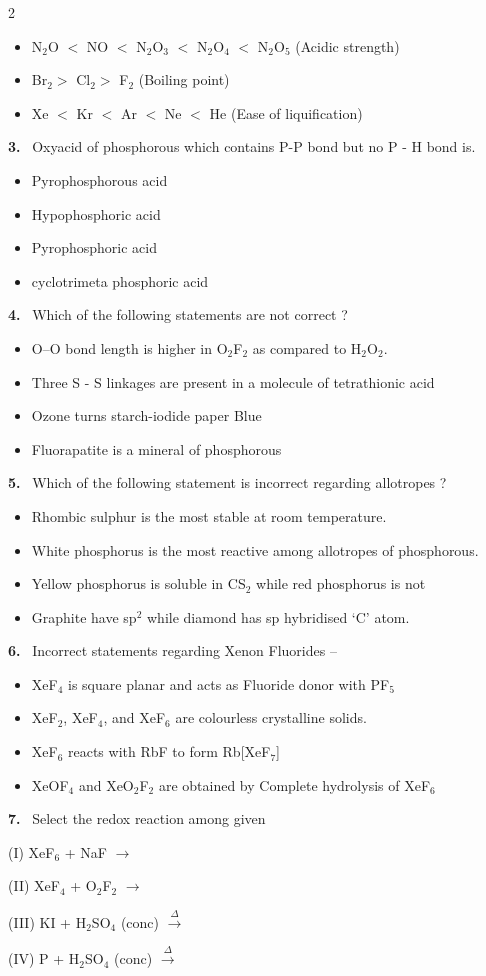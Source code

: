 \documentclass[10pt]{extarticle}
\newcommand{\qn}[1]{\par\smallskip\noindent\textbf{#1.}~}
\newenvironment{qoptions}{\begin{itemize}[leftmargin=1.8em,itemsep=1pt,topsep=2pt,label={}]}{\end{itemize}}
\newcommand{\opt}[2]{\item[(#1)] #2}
\begin{document}
\begin{multicols}{2}
\begin{qoptions}
\opt{B}{N$_2$O $<$ NO $<$ N$_2$O$_3$ $<$ N$_2$O$_4$ $<$ N$_2$O$_5$ (Acidic strength)}
\opt{C}{Br$_2>$ Cl$_2>$ F$_2$ (Boiling point)}
\opt{D}{Xe $<$ Kr $<$ Ar $<$ Ne $<$ He (Ease of liquification)}
\end{qoptions}
\qn{3} Oxyacid of phosphorous which contains P-P bond but no P - H bond is.
\begin{qoptions}
\opt{A}{Pyrophosphorous acid}
\opt{B}{Hypophosphoric acid}
\opt{C}{Pyrophosphoric acid}
\opt{D}{cyclotrimeta phosphoric acid}
\end{qoptions}
\qn{4} Which of the following statements are not correct ?
\begin{qoptions}
\opt{A}{O--O bond length is higher in O$_2$F$_2$ as compared to H$_2$O$_2$.}
\opt{B}{Three S - S linkages are present in a molecule of tetrathionic acid}
\opt{C}{Ozone turns starch-iodide paper Blue}
\opt{D}{Fluorapatite is a mineral of phosphorous}
\end{qoptions}
\qn{5} Which of the following statement is incorrect regarding allotropes ?
\begin{qoptions}
\opt{A}{Rhombic sulphur is the most stable at room temperature.}
\opt{B}{White phosphorus is the most reactive among allotropes of phosphorous.}
\opt{C}{Yellow phosphorus is soluble in CS$_2$ while red phosphorus is not}
\opt{D}{Graphite have sp$^2$ while diamond has sp hybridised `C' atom.}
\end{qoptions}
\qn{6} Incorrect statements regarding Xenon Fluorides --
\begin{qoptions}
\opt{A}{XeF$_4$ is square planar and acts as Fluoride donor with PF$_5$}
\opt{B}{XeF$_2$, XeF$_4$, and XeF$_6$ are colourless crystalline solids.}
\opt{C}{XeF$_6$ reacts with RbF to form Rb[XeF$_7$]}
\opt{D}{XeOF$_4$ and XeO$_2$F$_2$ are obtained by Complete hydrolysis of XeF$_6$}
\end{qoptions}
\qn{7} Select the redox reaction among given

(I) XeF$_6$ + NaF $\longrightarrow$

(II) XeF$_4$ + O$_2$F$_2$ $\longrightarrow$

(III) KI + H$_2$SO$_4$ (conc) $\xrightarrow{\Delta}$

(IV) P + H$_2$SO$_4$ (conc) $\xrightarrow{\Delta}$


\end{multicols}
\end{document}
